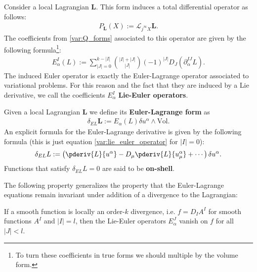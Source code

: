     \begin{example}
        Consider a local Lagrangian $\mathbf{L}$. This form induces a total differential operator as follows:
        \begin{gather}
            P_{\mathbf{L}}(X) := \mathcal{L}_{j^\infty X}\mathbf{L}.
        \end{gather}
        The coefficients from \ref{var:Q_forms} associated to this operator are given by the following formula\footnote{To turn these coefficients in true forms we should multiple by the volume form.}:
        \begin{gather}
            \label{var:lie_euler_operator}
            E^I_\alpha(L) := \sum_{|J|=0}^{k-|I|}\binom{|I|+|J|}{|J|}(-1)^{|J|}D_J\left(\partial^{IJ}_\alpha L\right).
        \end{gather}
        The induced Euler operator is exactly the Euler-Lagrange operator associated to variational problems. For this reason and the fact that they are induced by a Lie derivative, we call the coefficients $E^I_\alpha$ \textbf{Lie-Euler operators}.

        Given a local Lagrangian $\mathbf{L}$ we define its \textbf{Euler-Lagrange form} as
        \begin{gather}
            \delta_{EL}\mathbf{L} := E_\alpha(L)\delta u^\alpha\wedge\text{Vol}.
        \end{gather}
        An explicit formula for the Euler-Lagrange derivative is given by the following formula (this is just equation \ref{var:lie_euler_operator} for $|I|=0$):
        \begin{gather}
            \label{var:euler_lagrange_derivative}
            \delta_{EL}L := \left(\pderiv{L}{u^\alpha} - D_\mu\pderiv{L}{u^\alpha_\mu} + \cdots\right)\delta u^\alpha.
        \end{gather}
        Functions that satisfy $\delta_{EL}L=0$ are said to be \textbf{on-shell}.
    \end{example}

    The following property generalizes the property that the Euler-Lagrange equations remain invariant under addition of a divergence to the Lagrangian:
    \begin{property}
        If a smooth function is locally an order-$k$ divergence, i.e. $f=D_IA^I$ for smooth functions $A^I$ and $|I|=l$, then the Lie-Euler operators $E^J_\alpha$ vanish on $f$ for all $|J|<l$.
    \end{property}

